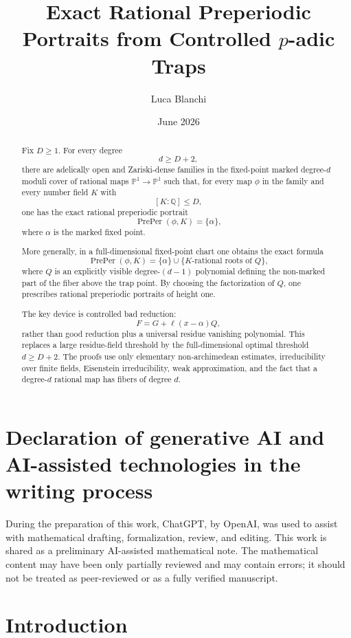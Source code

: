 \documentclass[11pt]{article}
\title{Exact Rational Preperiodic Portraits from Controlled \(p\)-adic Traps}
\author{Luca Blanchi}
\date{June 2026}
\begin{document}
\maketitle

\begin{abstract}
Fix \(D\ge1\). For every degree
\[
d\ge D+2,
\]
there are adelically open and Zariski-dense families in the fixed-point marked degree-\(d\) moduli cover of rational maps \(\mathbb P^1\to\mathbb P^1\) such that, for every map \(\phi\) in the family and every number field \(K\) with
\[
[K:\mathbb Q]\le D,
\]
one has the exact rational preperiodic portrait
\[
\operatorname{PrePer}(\phi,K)=\{\alpha\},
\]
where \(\alpha\) is the marked fixed point.

More generally, in a full-dimensional fixed-point chart one obtains the exact formula
\[
\operatorname{PrePer}(\phi,K)
=
\{\alpha\}\cup\{\text{\(K\)-rational roots of }Q\},
\]
where \(Q\) is an explicitly visible degree-\((d-1)\) polynomial defining the non-marked part of the fiber above the trap point. By choosing the factorization of \(Q\), one prescribes rational preperiodic portraits of height one.

The key device is controlled bad reduction:
\[
F=G+\ell(x-\alpha)Q,
\]
rather than good reduction plus a universal residue vanishing polynomial. This replaces a large residue-field threshold by the full-dimensional optimal threshold \(d\ge D+2\). The proofs use only elementary non-archimedean estimates, irreducibility over finite fields, Eisenstein irreducibility, weak approximation, and the fact that a degree-\(d\) rational map has fibers of degree \(d\).
\end{abstract}

\section*{Declaration of generative AI and AI-assisted technologies in the writing process}
During the preparation of this work, ChatGPT, by OpenAI, was used to assist with mathematical drafting, formalization, review, and editing. This work is shared as a preliminary AI-assisted mathematical note. The mathematical content may have been only partially reviewed and may contain errors; it should not be treated as peer-reviewed or as a fully verified manuscript.

\section{Introduction}
\end{document}
